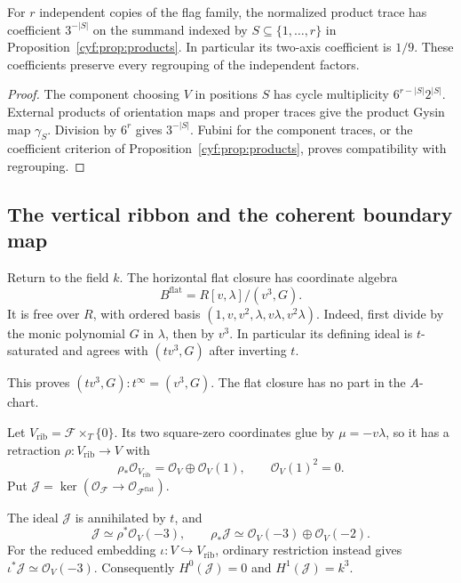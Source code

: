 \begin{corollary}\label{cyt:cor:products}
For \(r\) independent copies of the flag family, the normalized
product trace has coefficient \(3^{-|S|}\) on the summand
indexed by \(S\subseteq\{1,\ldots,r\}\) in
Proposition~\ref{cyf:prop:products}. In particular its two-axis
coefficient is \(1/9\). These coefficients preserve every
regrouping of the independent factors.
\end{corollary}

\begin{proof}
The component choosing \(V\) in positions \(S\) has cycle
multiplicity \(6^{r-|S|}2^{|S|}\). External products of
orientation maps and proper traces give the product Gysin map
\(\gamma_S\). Division by \(6^r\) gives \(3^{-|S|}\).
Fubini for the component traces, or the coefficient criterion
of Proposition~\ref{cyf:prop:products}, proves compatibility
with regrouping.
\end{proof}

\subsection{The vertical ribbon and the coherent boundary map}

Return to the field \(k\). The horizontal flat closure has
coordinate algebra
\begin{equation}\label{cyt:eq:flat}
 B^{\mathrm{flat}}=R[v,\lambda]/(v^3,G).
\end{equation}
It is free over \(R\), with ordered basis
\((1,v,v^2,\lambda,v\lambda,v^2\lambda)\).
Indeed, first divide by the monic polynomial \(G\) in
\(\lambda\), then by \(v^3\). In particular its defining
ideal is \(t\)-saturated and agrees with \((tv^3,G)\)
after inverting \(t\).

This proves
\((tv^3,G):t^\infty=(v^3,G)\).
The flat closure has no part in the \(A\)-chart.

Let \(V_{\mathrm{rib}}=\mathscr F\times_T\{0\}\).
Its two square-zero coordinates glue by \(\mu=-v\lambda\),
so it has a retraction \(\rho:V_{\mathrm{rib}}\to V\) with
\[
 \rho_*\mathcal O_{V_{\mathrm{rib}}}
        =\mathcal O_V\oplus\mathcal O_V(1),
 \qquad \mathcal O_V(1)^2=0.
\]
Put \(\mathcal J=\ker(\mathcal O_{\mathscr F}
\to\mathcal O_{\mathscr F^{\mathrm{flat}}})\).

\begin{lemma}\label{cyt:lem:ribbon}
The ideal \(\mathcal J\) is annihilated by \(t\), and
\begin{equation}\label{cyt:eq:ribbon}
 \mathcal J\simeq\rho^*\mathcal O_V(-3),\qquad
 \rho_*\mathcal J\simeq\mathcal O_V(-3)\oplus\mathcal O_V(-2).
\end{equation}
For the reduced embedding \(\iota:V\hookrightarrow V_{\mathrm{rib}}\),
ordinary restriction instead gives
\(\iota^*\mathcal J\simeq\mathcal O_V(-3)\).
Consequently \(H^0(\mathcal J)=0\) and
\(H^1(\mathcal J)=k^3\).
\end{lemma}

